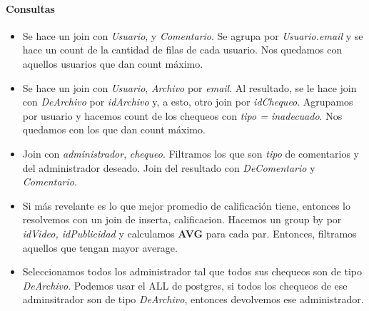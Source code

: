 \begin{multicols}{2}
	\paragraph{Consultas}
	\begin{itemize}
		\item Se hace un join con \textit{Usuario}, y \textit{Comentario}. Se agrupa por \textit{Usuario.email} y se hace un count de la cantidad de filas de cada usuario. Nos quedamos con aquellos usuarios que dan count máximo.
		\item Se hace un join con \textit{Usuario}, \textit{Archivo} por \textit{email}. Al resultado, se le hace join con \textit{DeArchivo} por \textit{idArchivo} y, a esto, otro join por \textit{idChequeo}. Agrupamos por usuario y hacemos count de los chequeos con \textit{tipo = inadecuado}. Nos quedamos con los que dan count máximo. 
		\item Join con \textit{administrador}, \textit{chequeo}. Filtramos los que son \textit{tipo} de comentarios y del administrador deseado. Join del resultado con \textit{DeComentario} y \textit{Comentario}. 
		\item Si más revelante es lo que mejor promedio de calificación tiene, entonces lo resolvemos con un join de inserta, calificacion. Hacemos un group by por \textit{idVideo, idPublicidad} y calculamos \textbf{AVG} para cada par. Entonces, filtramos aquellos que tengan mayor average.
		\item Seleccionamos todos los administrador tal que todos sus chequeos son de tipo \textit{DeArchivo}. Podemos usar el ALL de postgres, si todos los chequeos de ese adminsitrador son de tipo \textit{DeArchivo}, entonces devolvemos ese administrador.
	\end{itemize}
\end{multicols}